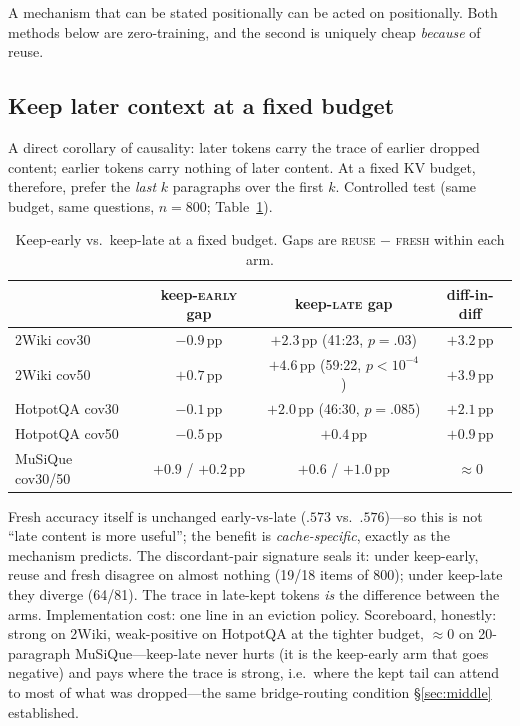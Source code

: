 \documentclass[11pt]{article}
\newcommand{\pp}{\,\mathrm{pp}}
\newcommand{\fresh}{\textsc{fresh}}
\newcommand{\reuse}{\textsc{reuse}}
\begin{document}
A mechanism that can be stated positionally can be acted on positionally. Both methods below are zero-training, and the second is uniquely cheap \emph{because} of reuse.

\subsection{Keep later context at a fixed budget}
\label{sec:keeplate}

A direct corollary of causality: later tokens carry the trace of earlier dropped content; earlier tokens carry nothing of later content. At a fixed KV budget, therefore, prefer the \emph{last} $k$ paragraphs over the first $k$. Controlled test (same budget, same questions, $n=800$; Table~\ref{tab:keeplate}).

\begin{table}[t]
\centering
\caption{Keep-early vs.\ keep-late at a fixed budget. Gaps are \reuse{} $-$ \fresh{} within each arm.}
\label{tab:keeplate}
\begin{tabular}{lccc}
\toprule
& keep-\textsc{early} gap & keep-\textsc{late} gap & diff-in-diff \\
\midrule
2Wiki cov30 & $-0.9\pp$ & $\mathbf{+2.3}\pp$ {\scriptsize(41:23, $p{=}.03$)} & $+3.2\pp$ \\
2Wiki cov50 & $+0.7\pp$ & $\mathbf{+4.6}\pp$ {\scriptsize(59:22, $p{<}10^{-4}$)} & $+3.9\pp$ \\
HotpotQA cov30 & $-0.1\pp$ & $\mathbf{+2.0}\pp$ {\scriptsize(46:30, $p{=}.085$)} & $+2.1\pp$ \\
HotpotQA cov50 & $-0.5\pp$ & $+0.4\pp$ & $+0.9\pp$ \\
MuSiQue cov30/50 & $+0.9$ / $+0.2\pp$ & $+0.6$ / $+1.0\pp$ & $\approx 0$ \\
\bottomrule
\end{tabular}
\end{table}

Fresh accuracy itself is unchanged early-vs-late ($.573$ vs.\ $.576$)---so this is not ``late content is more useful''; the benefit is \emph{cache-specific}, exactly as the mechanism predicts. The discordant-pair signature seals it: under keep-early, reuse and fresh disagree on almost nothing (19/18 items of 800); under keep-late they diverge (64/81). The trace in late-kept tokens \emph{is} the difference between the arms. Implementation cost: one line in an eviction policy. Scoreboard, honestly: strong on 2Wiki, weak-positive on HotpotQA at the tighter budget, $\approx 0$ on 20-paragraph MuSiQue---keep-late never hurts (it is the keep-early arm that goes negative) and pays where the trace is strong, i.e.\ where the kept tail can attend to most of what was dropped---the same bridge-routing condition \S\ref{sec:middle} established.
\end{document}
